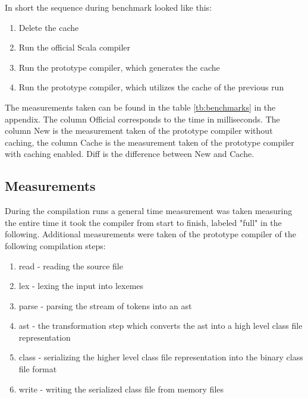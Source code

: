 \documentclass{VUMIFPSbakalaurinis}
\begin{document}

In short the sequence during benchmark looked like this:

\begin{enumerate}
\item{Delete the cache}
\item{Run the official Scala compiler}
\item{Run the prototype compiler, which generates the cache}
\item{Run the prototype compiler, which utilizes the cache of the previous run}
\end{enumerate}

The measurements taken can be found in the table \ref{tb:benchmarks} in the appendix.
The column Official corresponds to the time in milliseconds.
The column New is the measurement taken of the prototype compiler without caching, the column Cache is the measurement taken of the prototype compiler with caching enabled.
Diff is the difference between New and Cache.

\subsection{Measurements}

During the compilation runs a general time measurement was taken measuring the entire time it took the compiler from start to finish, labeled "full" in the following.
Additional measurements were taken of the prototype compiler of the following compilation steps:

\begin{enumerate}
\item{read - reading the source file}
\item{lex - lexing the input into lexemes}
\item{parse - parsing the stream of tokens into an ast}
\item{ast - the transformation step which converts the ast into a high level class file representation}
\item{class - serializing the higher level class file representation into the binary class file format}
\item{write - writing the serialized class file from memory files}
\end{enumerate}
\end{document}
